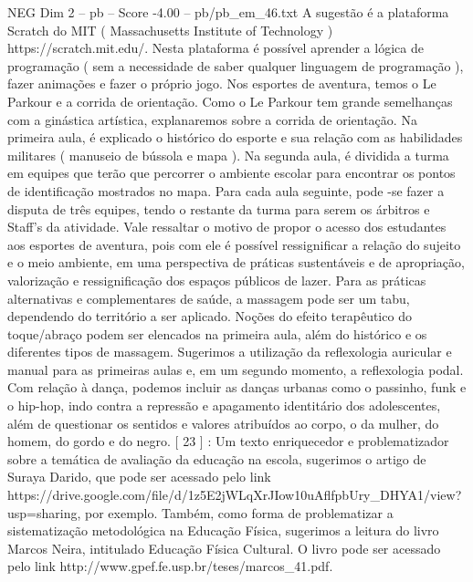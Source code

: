 \begin{textsample}{NEG Dim 2 – pb – Score -4.00 – pb/pb\_em\_46.txt}
A sugestão é a plataforma Scratch do MIT ( Massachusetts Institute of Technology ) https://scratch.mit.edu/.
Nesta plataforma é possível aprender a lógica de programação ( sem a necessidade de saber qualquer linguagem de programação ), fazer animações e fazer o próprio jogo.
Nos esportes de aventura, temos o Le Parkour e a corrida de orientação.
Como o Le Parkour tem grande semelhanças com a ginástica artística, explanaremos sobre a corrida de orientação.
Na primeira aula, é explicado o histórico do esporte e sua relação com as habilidades militares ( manuseio de bússola e mapa ).
Na segunda aula, é dividida a turma em equipes que terão que percorrer o ambiente escolar para encontrar os pontos de identificação mostrados no mapa.
Para cada aula seguinte, pode -se fazer a disputa de três equipes, tendo o restante da turma para serem os árbitros e Staff’s da atividade.
Vale ressaltar o motivo de propor o acesso dos estudantes aos esportes de aventura, pois com ele é possível ressignificar a relação do sujeito e o meio ambiente, em uma perspectiva de práticas sustentáveis e de apropriação, valorização e ressignificação dos espaços públicos de lazer.
Para as práticas alternativas e complementares de saúde, a massagem pode ser um tabu, dependendo do território a ser aplicado.
Noções do efeito terapêutico do toque/abraço podem ser elencados na primeira aula, além do histórico e os diferentes tipos de massagem.
Sugerimos a utilização da reflexologia auricular e manual para as primeiras aulas e, em um segundo momento, a reflexologia podal.
Com relação à dança, podemos incluir as danças urbanas como o passinho, funk e o hip-hop, indo contra a repressão e apagamento identitário dos adolescentes, além de questionar os sentidos e valores atribuídos ao corpo, o da mulher, do homem, do gordo e do negro. [ 23 ] : Um texto enriquecedor e problematizador sobre a temática de avaliação da educação na escola, sugerimos o artigo de Suraya Darido, que pode ser acessado pelo link https://drive.google.com/file/d/1z5E2jWLqXrJIow10uAflfpbUry\_DHYA1/view? usp=sharing, por exemplo.
Também, como forma de problematizar a sistematização metodológica na Educação Física, sugerimos a leitura do livro Marcos Neira, intitulado Educação Física Cultural.
O livro pode ser acessado pelo link http://www.gpef.fe.usp.br/teses/marcos\_41.pdf.

\end{textsample}
